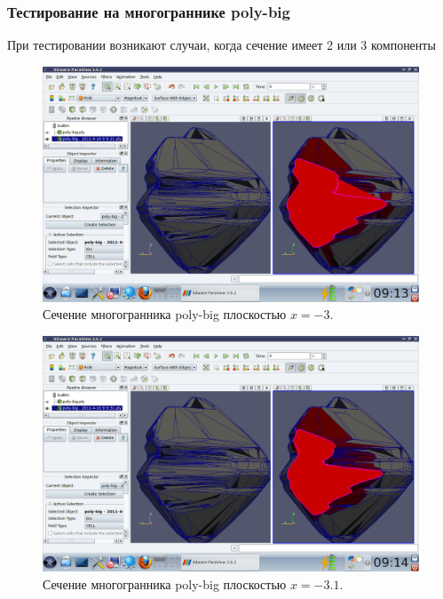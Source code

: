 \documentclass[a4paper,12pt, titlepage]{article}
\begin{document}
\subsubsection{Тестирование на многограннике poly-big}
	\begin{flushleft}
		При тестировании возникают случаи, когда сечение имеет 2 или 3 компоненты
	\end{flushleft}
	\begin{flushleft}
		\begin{figure}[p]
		    \includegraphics[trim = 220 65 10 140, clip, width=15cm]{poly-big/3.png}
		    \caption{Сечение многогранника poly-big плоскостью $x = -3$.}
		    \label{poly-big-1}
		\end{figure}
	\end{flushleft}
	\begin{flushleft}
		\begin{figure}[p]
		    \includegraphics[trim = 220 65 10 140, clip, width=15cm]{poly-big/31.png}
		    \caption{Сечение многогранника poly-big плоскостью $x = -3.1$.}
		    \label{poly-big-2}
		\end{figure}
	\end{flushleft}
\end{document}
